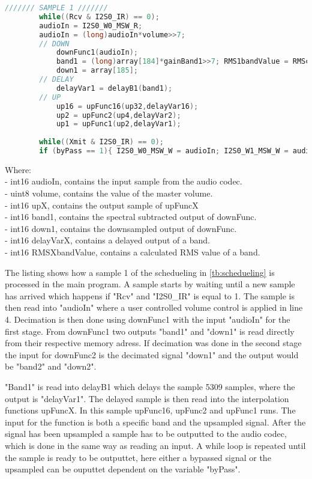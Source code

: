 \begin{lstlisting}[language=C, caption = {Sample 1},label={listingSample}]
/////// SAMPLE 1 ///////
    	while((Rcv & I2S0_IR) == 0); 							
	    audioIn = I2S0_W0_MSW_R;  
	    audioIn = (long)audioIn*volume>>7;	
	    // DOWN
		    downFunc1(audioIn); 			
			band1 = (long)array[184]*gainBand1>>7; RMS1bandValue = RMScalculate(RMS1bandBuffer,band1,&RMS1bandPtr, &RMS1bandSum);				
			down1 = array[185];							
		// DELAY			
			delayVar1 = delayB1(band1);
		// UP
			up16 = upFunc16(up32,delayVar16);
			up2 = upFunc2(up4,delayVar2);
			up1 = upFunc1(up2,delayVar1);
		
	    while((Xmit & I2S0_IR) == 0);  					
		if (byPass == 1){ I2S0_W0_MSW_W = audioIn; I2S0_W1_MSW_W = audioIn;} else { I2S0_W0_MSW_W = up1; I2S0_W1_MSW_W = up1;} 
\end{lstlisting}
Where: \\
- int16 audioIn, contains the input sample from the audio codec. \\
- uint8 volume, contains the value of the master volume. \\
- int16 upX, contains the output sample of upFuncX \\
- int16 band1, contains the spectral subtracted output of downFunc. \\
- int16 down1, contains the downsampled output of downFunc. \\
- int16 delayVarX, contains a delayed output of a band. \\
- int16 RMSXbandValue, contains a calculated RMS value of a band.

The listing shows how a sample 1 of the schedueling in \autoref{tb:schedueling} is processed in the main program. A sample starts by waiting until a new sample has arrived which happens if "Rcv" and "I2S0\_IR" is equal to 1. The sample is then read into "audioIn" where a user controlled volume control is applied in line 4. Decimation is then done using downFunc1 with the input "audioIn" for the first stage. From downFunc1 two outputs "band1" and "down1" is read directly from their respective memory adress. If decimation was done in the second stage the input for downFunc2 is the decimated signal "down1" and the output would be "band2" and "down2".

"Band1" is read into delayB1 which delays the sample 5309 samples, where the output is "delayVar1". The delayed sample is then read into the interpolation functions upFuncX. In this sample upFunc16, upFunc2 and upFunc1 runs. The input for the function is both a specific band and the upsampled signal. After the signal has been upsampled a sample has to be outputted to the audio codec, which is done in the same way as reading an input. A while loop is repeated until the sample is ready to be outputtet, here either a bypassed signal or the upsampled can be ouputtet dependent on the variable "byPass". %



